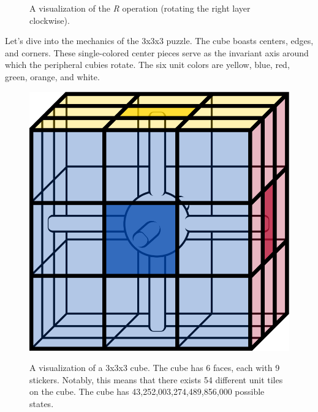 \documentclass[12pt]{article}
\begin{document}
\begin{figure}[h]
\begin{minipage}[c]{0.2\textwidth}
    \end{minipage}
    \caption{A visualization of the \textit{R} operation (rotating the right layer clockwise).}
\end{figure}

Let's dive into the mechanics of the 3x3x3 puzzle. The cube boasts centers, edges, and corners. These single-colored center pieces serve as the invariant axis around which the peripheral cubies rotate. The six unit colors are yellow, blue, red, green, orange, and white.

\begin{figure}[h]
    \hfill 
    \begin{minipage}[c]{0.2\textwidth} 
        \centering
        \includegraphics[scale=0.1]{moves/core.png}
    \end{minipage}
    \hfill 
    \begin{minipage}[c]{0.59\textwidth} 
        \vspace*{\fill} 
        A visualization of a 3x3x3 cube. The cube has 6 faces, each with 9 stickers. Notably, this means that there exists 54 different unit tiles on the cube. The cube has 43,252,003,274,489,856,000 possible states.\footnotemark
        \vspace*{\fill}
    \end{minipage}
    \hfill 
\end{figure}
\end{document}
